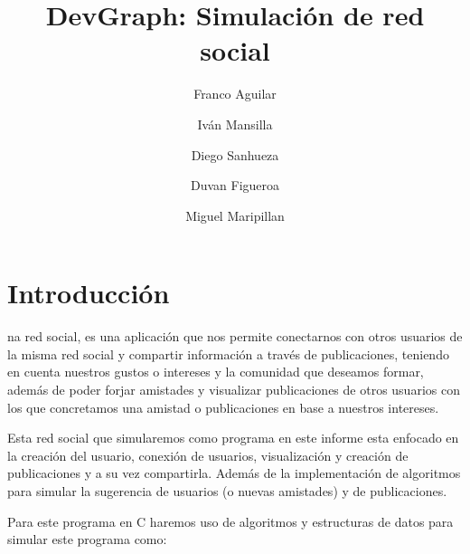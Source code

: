 \documentclass[9pt,letterpaper,onecolumn]{rho-class/rho}
\title{DevGraph: Simulación de red social}
\author[$\dagger$]{Franco Aguilar}
\author[$\dagger$]{Iván Mansilla}
\author[$\dagger$]{Diego Sanhueza}
\author[$\dagger$]{Duvan Figueroa}
\author[$\dagger$]{Miguel Maripillan}
\affil[$\dagger$]{Universidad de Magallanes}
\begin{document}
	
    \maketitle
    \thispagestyle{firststyle}
    \tableofcontents


\newpage
\section{Introducción}

na red social, es una aplicación que nos permite conectarnos con otros usuarios de la misma red social y compartir información a través de publicaciones, teniendo en cuenta nuestros gustos o intereses y la comunidad que deseamos formar, además de poder forjar amistades y visualizar publicaciones de otros usuarios con los que concretamos una amistad o publicaciones en base a nuestros intereses.

Esta red social que simularemos como programa en este informe esta enfocado en la creación del usuario, conexión de usuarios, visualización y creación de publicaciones y a su vez compartirla. Además de la implementación de algoritmos para simular la sugerencia de usuarios (o nuevas amistades) y de publicaciones.

Para este programa en C haremos uso de algoritmos y estructuras de datos para simular este programa como:
\end{document}
